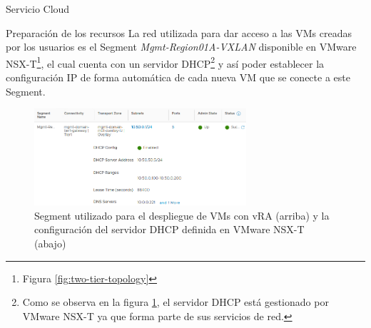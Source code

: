 \begin{subsection}{Servicio Cloud}
\begin{subsubsection}{Preparación de los recursos}
    La red utilizada para dar acceso a las VMs creadas por los usuarios es el Segment \textit{Mgmt-Region01A-VXLAN} disponible en VMware NSX-T\footnote{Figura \ref{fig:two-tier-topology}}, el cual cuenta con un servidor DHCP\footnote{Como se observa en la figura \ref{fig:topology-segment-mgmt}, el servidor DHCP está gestionado por VMware NSX-T ya que forma parte de sus servicios de red.} y así poder establecer la configuración IP de forma automática de cada nueva VM que se conecte a este Segment. 
    \begin{figure}[h]
        \centering
        \includegraphics[width=0.7\textwidth]{imaxes/pruebaconcepto/vrealize/segment-MGMT.png}
        \caption{Segment utilizado para el despliegue de VMs con vRA (arriba) y la configuración del servidor DHCP definida en VMware NSX-T (abajo)}
        \label{fig:topology-segment-mgmt}
    \end{figure}
    \FloatBarrier

\end{subsubsection}
\end{subsection}
